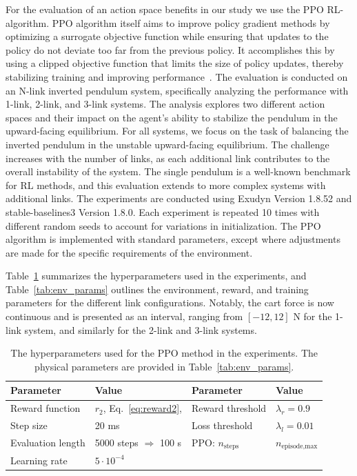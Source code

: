 For the evaluation of an action space benefits in our study we use the PPO RL-algorithm. PPO algorithm itself aims to improve policy gradient methods by optimizing a surrogate objective function while ensuring that updates to the policy do not deviate too far from the previous policy. It accomplishes this by using a clipped objective function that limits the size of policy updates, thereby stabilizing training and improving performance~\cite{schulman2017ppo}. The evaluation is conducted on an N-link inverted pendulum system, specifically analyzing the performance with 1-link, 2-link, and 3-link systems. The analysis explores two different action spaces and their impact on the agent's ability to stabilize the pendulum in the upward-facing equilibrium. 
For all systems, we focus on the task of balancing the inverted pendulum in the unstable upward-facing equilibrium. The challenge increases with the number of links, as each additional link contributes to the overall instability of the system. The single pendulum is a well-known benchmark for RL methods, and this evaluation extends to more complex systems with additional links.
The experiments are conducted using Exudyn Version 1.8.52 and stable-baselines3 Version 1.8.0. Each experiment is repeated 10 times with different random seeds to account for variations in initialization. The PPO algorithm is implemented with standard parameters, except where adjustments are made for the specific requirements of the environment.

Table~\ref{tab:hyperparameters} summarizes the hyperparameters used in the experiments, and Table~\ref{tab:env_params} outlines the environment, reward, and training parameters for the different link configurations. Notably, the cart force is now continuous and is presented as an interval, ranging from \([-12, 12]\) N for the 1-link system, and similarly for the 2-link and 3-link systems.

\begin{table}[h]
	\centering
	\caption{The hyperparameters used for the PPO method in the experiments. The physical parameters are provided in Table~\ref{tab:env_params}.}
	\label{tab:hyperparameters}
	\begin{tabular}{ll|ll}
		\toprule
		\textbf{Parameter}       & \textbf{Value} & \textbf{Parameter}       & \textbf{Value} \\ \midrule
		Reward function          & $r_2$, Eq.~\ref{eq:reward2},  & Reward threshold         & $\lambda_r = 0.9$ \\ 
		Step size                & 20 ms           & Loss threshold           & $\lambda_l = 0.01$ \\ 
		Evaluation length        & 5000 steps $\Rightarrow$ 100 s & PPO: $n_{\text{steps}}$       & $n_{\text{episode,max}}$ \\ 
		Learning rate      & $5 \cdot 10^{-4}$ & & \\ \bottomrule
	\end{tabular}
\end{table}

